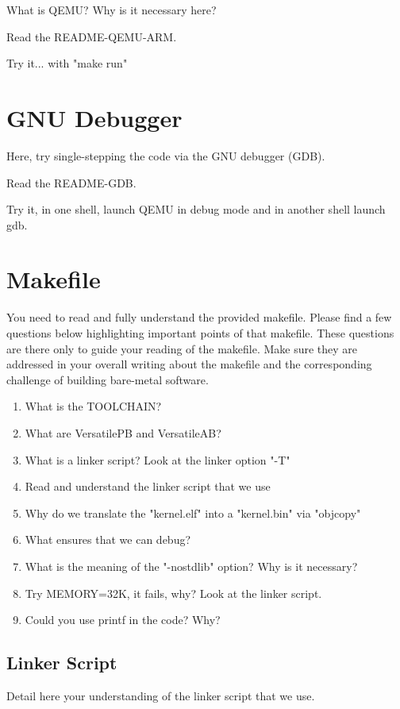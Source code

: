 \documentclass[10]{article}
\begin{document}
What is QEMU?
Why is it necessary here?

Read the README-QEMU-ARM.

Try it... with "make run"

\section{GNU Debugger}

Here, try single-stepping the code via the GNU debugger (GDB).

Read the README-GDB.

Try it, in one shell, launch QEMU in debug mode
and in another shell launch gdb.

\section{Makefile}

You need to read and fully understand the provided makefile.
Please find a few questions below highlighting important points
of that makefile. These questions are there only to guide your
reading of the makefile. Make sure they are addressed in your
overall writing about the makefile and the corresponding challenge
of building bare-metal software.

\begin{enumerate}
\item 
  What is the TOOLCHAIN?
\item
  What are VersatilePB and VersatileAB?
\item
  What is a linker script? Look at the linker option "-T"
\item
  Read and understand the linker script that we use
\item
  Why do we translate the "kernel.elf" into a "kernel.bin" via "objcopy"  
\item
  What ensures that we can debug?
\item
  What is the meaning of the "-nostdlib" option? Why is it necessary?
\item
  Try MEMORY=32K, it fails, why? Look at the linker script.
\item
  Could you use printf in the code? Why?
\end{enumerate}

\subsection{Linker Script}

Detail here your understanding of the linker script that we use.
\end{document}
